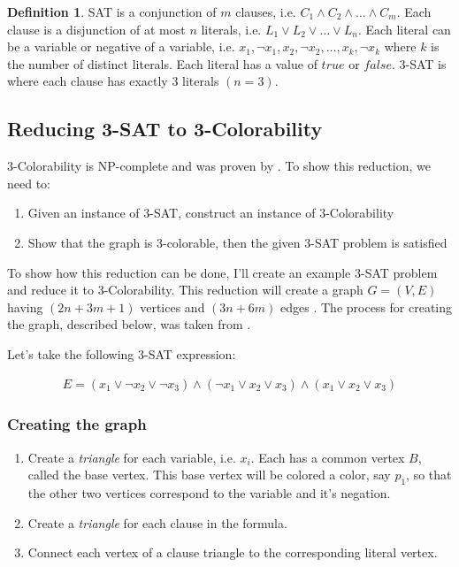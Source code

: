 \documentclass{article}
\theoremstyle{definition}
\newtheorem{definition}{Definition}
\begin{document}
\begin{definition}
SAT is a conjunction of $m$ clauses, i.e. $C_1 \wedge C_2 \wedge \dots \wedge C_m$. Each clause is a disjunction of at most $n$ literals, i.e. $L_1 \vee L_2 \vee \dots \vee L_n$. Each literal can be a variable or negative of a variable, i.e. $x_1, \neg x_1, x_2, \neg x_2, \dots , x_k, \neg x_k$ where $k$ is the number of distinct literals. Each literal has a value of $true$ or $false$. 3-SAT is where each clause has exactly 3 literals \((n = 3)\).
\end{definition}

\subsection*{Reducing 3-SAT to 3-Colorability}
3-Colorability is NP-complete and was proven by \cite{moret}. To show this reduction, we need to:

\begin{enumerate}
\item Given an instance of 3-SAT, construct an instance of 3-Colorability
\item Show that the graph is 3-colorable, then the given 3-SAT problem is satisfied
\end{enumerate}

To show how this reduction can be done, I'll create an example 3-SAT problem and reduce it to 3-Colorability. This reduction will create a graph \(G = (V, E)\) having \((2n + 3m + 1)\) vertices and \((3n+6m)\) edges \cite{moret}. The process for creating the graph, described below, was taken from \cite{sharma}.\newline

Let's take the following 3-SAT expression:

\begin{align*}
E = \left( x_1 \vee \neg x_2 \vee \neg x_3 \right) \wedge \left( \neg x_1 \vee x_2 \vee x_3 \right) \wedge \left( x_1 \vee x_2 \vee x_3 \right)
\end{align*}

\subsubsection*{Creating the graph}
\begin{enumerate}
\item Create a \emph{triangle} for each variable, i.e. \(x_i\). Each has a common vertex \(B\), called the base vertex. This base vertex will be colored a color, say \(p_1\), so that the other two vertices correspond to the variable and it's negation.
\item Create a \emph{triangle} for each clause in the formula.
\item Connect each vertex of a clause triangle to the corresponding literal vertex.
\end{enumerate}
\end{document}
